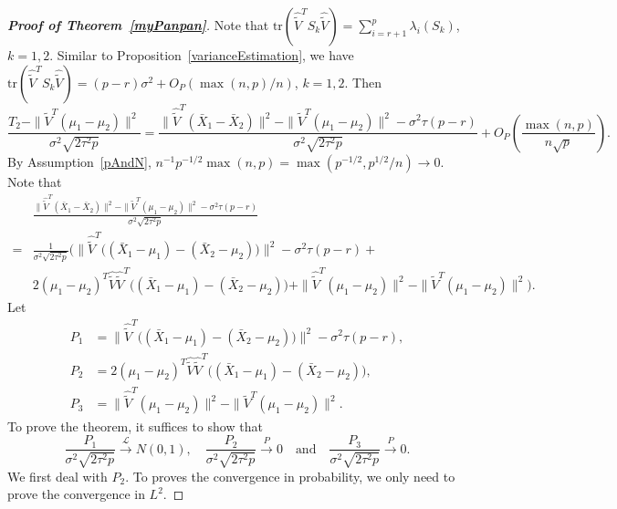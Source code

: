 \documentclass[review]{elsarticle}
\theoremstyle{plain}
\theoremstyle{definition}
\theoremstyle{remark}
\begin{document}
\begin{proof}[\textbf{Proof of Theorem~\ref{myPanpan}}]

    Note that $\mathrm{tr}(\hat{\tilde{V}}^T S_k\hat{\tilde{V}})=\sum_{i=r+1}^p \lambda_i(S_k)$, $k=1,2$.
    Similar to Proposition~\ref{varianceEstimation}, we have $\mathrm{tr}(\hat{\tilde{V}}^T S_k\hat{\tilde{V}})=(p-r)\sigma^2+O_P({\max(n,p)}/{n})$, $k=1,2$.
    Then
\begin{equation*}
        \frac{T_2-\|\tilde{V}^T(\mu_1-\mu_2)\|^2}{\sigma^2\sqrt{2\tau^2 p}}
        =
        \frac{\|\hat{\tilde{V}}^T(\bar{X}_1-\bar{X}_2)\|^2-\|\tilde{V}^T(\mu_1-\mu_2)\|^2
        -\sigma^2\tau (p-r)
        }{\sigma^2\sqrt{2\tau^2 p}}
        +O_P(\frac{\max(n,p)}{n\sqrt{p}}).
\end{equation*}
    By Assumption~\ref{pAndN}, ${n^{-1}p^{-1/2}}{\max(n,p)}=\max({p}^{-1/2},{p}^{1/2}/n)\to 0$.
    Note that
\begin{equation*}
    \begin{aligned}
        &\frac{\|\hat{\tilde{V}}^T(\bar{X}_1-\bar{X}_2)\|^2-\|\tilde{V}^T(\mu_1-\mu_2)\|^2
        -\sigma^2\tau (p-r)
        }{\sigma^2\sqrt{2\tau^2 p}}
        \\
        =&\frac{1}{\sigma^2\sqrt{2\tau^2 p}}\Big(
        \|\hat{\tilde{V}}^T\big((\bar{X}_1-\mu_1)-(\bar{X}_2-\mu_2)\big)\|^2-\sigma^2 \tau (p-r)+\\
        &2{(\mu_1-\mu_2)}^T \hat{\tilde{V}}\hat{\tilde{V}}^T\big((\bar{X}_1-\mu_1)-(\bar{X}_2-\mu_2)\big)
        +\|\hat{\tilde{V}}^T(\mu_1-\mu_2)\|^2-\|\tilde{V}^T(\mu_1-\mu_2)\|^2
        \Big).
    \end{aligned}
\end{equation*}
Let 
\begin{align*}
    P_1&=\|\hat{\tilde{V}}^T\big((\bar{X}_1-\mu_1)-(\bar{X}_2-\mu_2)\big)\|^2-\sigma^2 \tau (p-r),\\
    P_2&=2{(\mu_1-\mu_2)}^T \hat{\tilde{V}}\hat{\tilde{V}}^T\big((\bar{X}_1-\mu_1)-(\bar{X}_2-\mu_2)\big),\\
    P_3&=\|\hat{\tilde{V}}^T(\mu_1-\mu_2)\|^2-\|\tilde{V}^T(\mu_1-\mu_2)\|^2.
\end{align*}
To prove the theorem, it suffices to show that
$$
    \frac{P_1}{\sigma^2\sqrt{2\tau^2 p}}\xrightarrow{\mathcal{L}} N(0,1),
    \quad
    \frac{P_2}{\sigma^2\sqrt{2\tau^2 p}}\xrightarrow{P} 0
    \quad
    \textrm{and}
    \quad
    \frac{P_3}{\sigma^2\sqrt{2\tau^2 p}}\xrightarrow{P}0.
    $$
    We first deal with $P_2$.
    To proves the convergence in probability, we only need to prove the convergence in $L^2$.

\end{proof}
\end{document}
